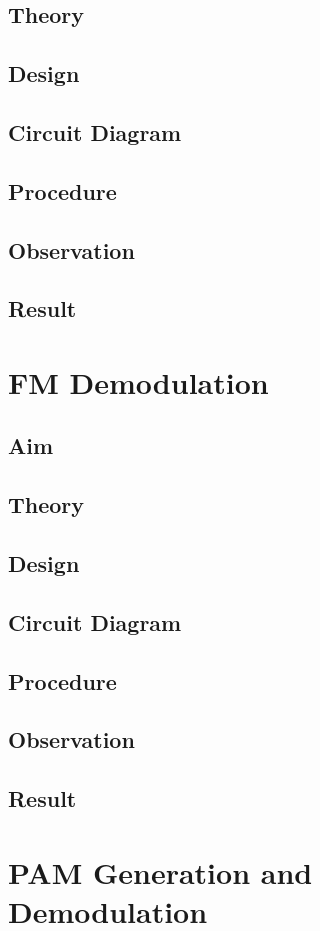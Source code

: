 \documentclass{book}
\begin{document}
\section*{Theory}
\section*{Design}
\section*{Circuit Diagram}
\section*{Procedure}
\section*{Observation}
\section*{Result}
\chapter[FM Demodulation]{FM Demodulation}
\section*{Aim}
\section*{Theory}
\section*{Design}
\section*{Circuit Diagram}
\section*{Procedure}
\section*{Observation}
\section*{Result}

\chapter[PAM Generation and Demodulation]{PAM Generation and Demodulation}
\end{document}
